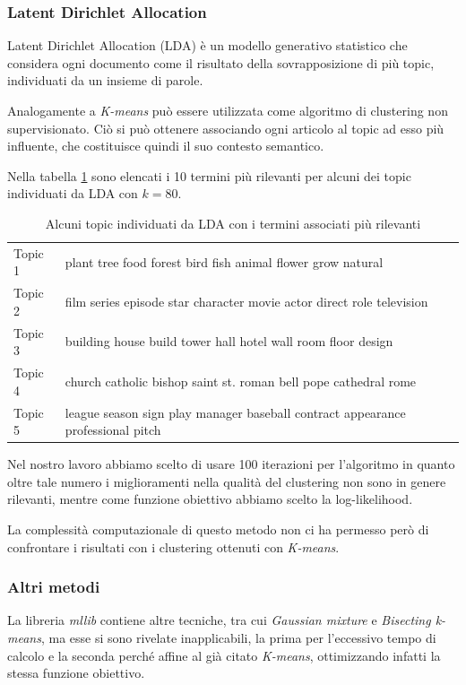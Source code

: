 \documentclass[
	11pt, %
	a4paper, %
	oneside, %
	headinclude,footinclude, %
	BCOR5mm, %
]{scrartcl}
\begin{document}
		\subsubsection{Latent Dirichlet Allocation}

			Latent Dirichlet Allocation (LDA)\cite{lda} è un modello generativo statistico che considera ogni documento come il risultato della sovrapposizione di più topic, individuati da un insieme di parole.

			Analogamente a \emph{K-means} può essere utilizzata come algoritmo di clustering non supervisionato. 
			Ciò si può ottenere associando ogni articolo al topic ad esso più influente, che costituisce quindi il suo contesto semantico.
			
			Nella tabella \ref{table:ldatopics} sono elencati i 10 termini più rilevanti per alcuni dei topic individuati da LDA con $k=80$.
			
			\begin{table}[!htbp]
			\vspace*{0.2cm}
			\hspace*{1cm}
			\begin{tabular}{l|l}
			Topic 1 & plant tree food forest bird fish animal flower grow natural\\
			Topic 2 & film series episode star character movie actor direct role television\\
			Topic 3 & building house build tower hall hotel wall room floor design\\
			Topic 4 & church catholic bishop saint st. roman bell pope cathedral rome\\
			Topic 5 & league season sign play manager baseball contract appearance professional pitch\\
			\end{tabular}
			\caption{Alcuni topic individuati da LDA con i termini associati più rilevanti}
			\label{table:ldatopics}
			\end{table}

			Nel nostro lavoro abbiamo scelto di usare 100 iterazioni per l'algoritmo in quanto oltre tale numero i miglioramenti nella qualità del clustering non sono in genere rilevanti\cite{ldaiterations}, mentre come funzione obiettivo abbiamo scelto la log-likelihood\cite{ldaevaluation}.

			La complessità computazionale di questo metodo non ci ha permesso però di confrontare i risultati con i clustering ottenuti con \emph{K-means}.

		\subsubsection{Altri metodi}
			La libreria \emph{mllib} contiene altre tecniche, tra cui \emph{Gaussian mixture} e \emph{Bisecting k-means}, ma esse si sono rivelate inapplicabili, la prima per l'eccessivo tempo di calcolo e la seconda perché affine al già citato \emph{K-means}, ottimizzando infatti la stessa funzione obiettivo.
\end{document}
